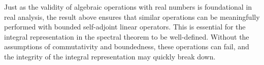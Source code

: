 Just as the validity of algebraic operations with real numbers is foundational in real analysis, the result above ensures that similar operations can be meaningfully performed with bounded self-adjoint linear operators. This is essential for the integral representation in the spectral theorem to be well-defined. Without the assumptions of commutativity and boundedness, these operations can fail, and the integrity of the integral representation may quickly break down.

